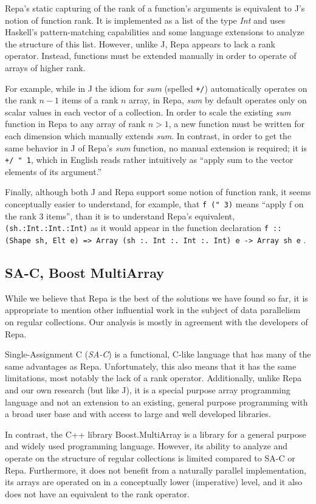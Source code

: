 Repa's static capturing of the rank of a function's arguments is equivalent to J's notion of function rank.
It is implemented as a list of the type \textit{Int} and 
uses Haskell's pattern-matching capabilities and some language extensions to analyze the structure of this list.
However, unlike J, Repa appears to lack a rank operator.
Instead, functions must be extended manually in order to operate of arrays of higher rank.

For example, while in J the idiom for \textit{sum} (spelled \texttt{+/}) 
automatically operates on the rank $n-1$ items of a rank $n$ array, 
in Repa, \textit{sum} by default operates only on scalar values in each vector of a collection.
In order to scale the existing \textit{sum} function in Repa to any array of rank $n > 1$, 
a new function must be written for each dimension which manually extends \textit{sum}\cite{dph}.
In contrast, in order to get the same behavior in J of Repa's \textit{sum} function, no manual extension is required; 
it is \texttt{+/ " 1}, which in English reads rather intuitively as ``apply sum to the vector elements of its argument.''

Finally, although both J and Repa support some notion of function rank, 
it seems conceptually easier to understand, for example, 
that \texttt{f (" 3)} means ``apply f on the rank 3 items'', than it is to understand Repa's equivalent, 
\texttt{(sh.:Int.:Int.:Int)} as it would appear in the function declaration  
\texttt{f :: (Shape sh, Elt e) => Array (sh :. Int :. Int :. Int) e -> Array sh e} .

\subsection{SA-C, Boost MultiArray}
While we believe that Repa is the best of the solutions we have found so far, 
it is appropriate to mention other influential work in the subject of data parallelism on regular collections.
Our analysis is mostly in agreement with the developers of Repa.\cite{dph}

Single-Assignment C (\textit{SA-C}) is a functional, C-like language 
that has many of the same advantages as Repa\cite{dph}\cite{sac}.
Unfortunately, this also means that it has the same limitations, most notably the lack of a rank operator.
Additionally, unlike Repa and our own research (but like J), 
it is a special purpose array programming language and 
not an extension to an existing, general purpose programming with a broad user base and 
with access to large and well developed libraries.

In contrast, the C++ library Boost.MultiArray is a library for a general purpose and widely used programming language\cite{boost}.
However, its ability to analyze and operate on the structure of regular collections is limited compared to SA-C or Repa.
Furthermore, it does not benefit from a naturally parallel implementation, 
its arrays are operated on in a conceptually lower (imperative) level, 
and it also does not have an equivalent to the rank operator. 
